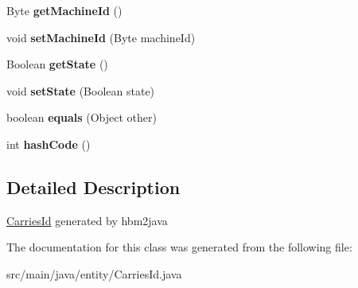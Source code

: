 \begin{DoxyCompactItemize}
Byte {\bfseries get\+Machine\+Id} ()
\item 
\mbox{\label{classentity_1_1_carries_id_aa5bba6ca3cb097ea91354987f1b6a2f0}} 
void {\bfseries set\+Machine\+Id} (Byte machine\+Id)
\item 
\mbox{\label{classentity_1_1_carries_id_a123b2805042dd0fe551c2e766b961129}} 
Boolean {\bfseries get\+State} ()
\item 
\mbox{\label{classentity_1_1_carries_id_a8f8f0f103d2fd8db15b6416370d690e1}} 
void {\bfseries set\+State} (Boolean state)
\item 
\mbox{\label{classentity_1_1_carries_id_ac343763b0821ae53aa653fc269cb0172}} 
boolean {\bfseries equals} (Object other)
\item 
\mbox{\label{classentity_1_1_carries_id_a2d5ebee74ab620ab24e2ab3da501cfd9}} 
int {\bfseries hash\+Code} ()
\end{DoxyCompactItemize}


\subsection{Detailed Description}
\mbox{\hyperlink{classentity_1_1_carries_id}{Carries\+Id}} generated by hbm2java 

The documentation for this class was generated from the following file\+:\begin{DoxyCompactItemize}
\item 
src/main/java/entity/Carries\+Id.\+java\end{DoxyCompactItemize}
